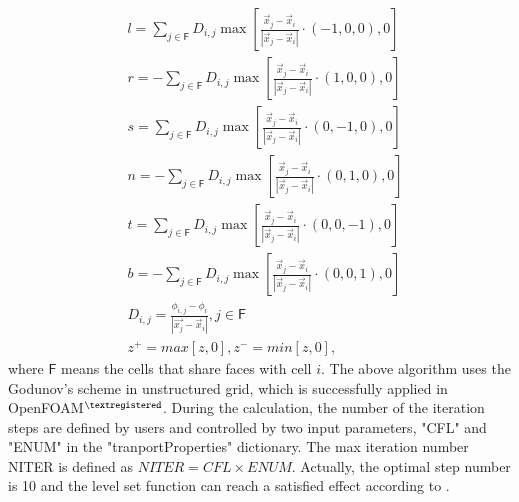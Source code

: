 \begin{equation}\label{25}
\begin{split}
&l=\sum_{j\in{\mathsf{F}}}{D_{i,j}}\max[\frac{\vec{x}_j-\vec{x}_i}{\left|{\vec{x}_j-\vec{x}_i}\right|}\cdot(-1,0,0),0]
\\
&r=-\sum_{j\in{\mathsf{F}}}{D_{i,j}}\max[\frac{\vec{x}_j-\vec{x}_i}{\left|{\vec{x}_j-\vec{x}_i}\right|}\cdot(1,0,0),0]
\\
&s=\sum_{j\in{\mathsf{F}}}{D_{i,j}}\max[\frac{\vec{x}_j-\vec{x}_i}{\left|{\vec{x}_j-\vec{x}_i}\right|}\cdot(0,-1,0),0]
\\
&n=-\sum_{j\in{\mathsf{F}}}{D_{i,j}}\max[\frac{\vec{x}_j-\vec{x}_i}{\left|{\vec{x}_j-\vec{x}_i}\right|}\cdot(0,1,0),0]
\\
&t=\sum_{j\in{\mathsf{F}}}{D_{i,j}}\max[\frac{\vec{x}_j-\vec{x}_i}{\left|{\vec{x}_j-\vec{x}_i}\right|}\cdot(0,0,-1),0]
\\
&b=-\sum_{j\in{\mathsf{F}}}{D_{i,j}}\max[\frac{\vec{x}_j-\vec{x}_i}{\left|{\vec{x}_j-\vec{x}_i}\right|}\cdot(0,0,1),0]
\\
&D_{i,j}=\frac{\phi_{i,j}-\phi_i}{\left|{\vec{x_j}-\vec{x}_i}\right|}, j\in{\mathsf{F}}
\\
&z^+=max[z,0], z^-=min[z,0],
\end{split}
\end{equation}
where $\mathsf{F}$ means the cells that share faces with cell $i$. The above algorithm uses the Godunov's scheme in unstructured grid, which is successfully applied in OpenFOAM$^{\textregistered}$. During the calculation, the number of the iteration steps are defined by users and controlled by two input parameters, "CFL" and "ENUM" in the "tranportProperties" dictionary. The max iteration number NITER is defined as $NITER=CFL\times{ENUM}$. Actually, the optimal step number is 10 and the level set function can reach a satisfied effect according to \cite{liu2017coupled}.

